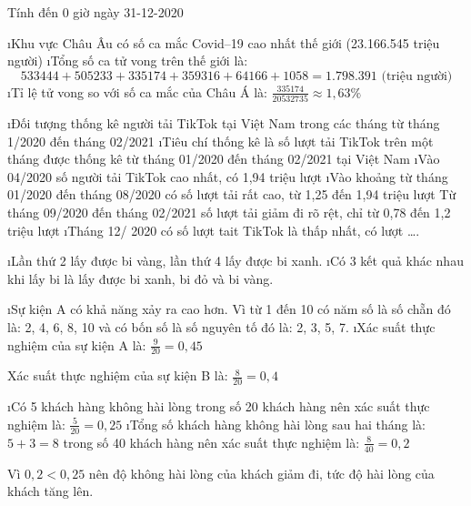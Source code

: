 \begin{Answer}{4}
		Tính đến 0 giờ ngày 31-12-2020
		\begin{enumerate}[a),leftmargin=*]
			\i Khu vực Châu Âu có số ca mắc Covid--19 cao nhất thế giới (23.166.545 triệu người)
			\i Tổng số ca tử vong trên thế giới là:
			\[533444 + 505233 + 335174 + 359316 + 64166 + 1058 = 1.798.391 \text{ (triệu người)}\]
			\i Tỉ lệ tử vong so với số ca mắc của Châu Á là:  $\frac{{335174}}{{20532735}} \approx 1,63\%$
		\end{enumerate}
	
\end{Answer}
\begin{Answer}{5}
		\begin{enumerate}[--,leftmargin=*]
			\i Đối tượng thống kê người tải TikTok tại Việt Nam trong các tháng từ tháng 1/2020 đến tháng 02/2021
			\i Tiêu chí thống kê là số lượt tải TikTok trên một tháng được thống kê từ tháng 01/2020 đến tháng 02/2021 tại Việt Nam
			\i Vào 04/2020 số người tải TikTok cao nhất, có 1,94 triệu lượt
			\i Vào khoảng từ tháng 01/2020 đến tháng 08/2020 có số lượt tải rất cao, từ 1,25  đến 1,94 triệu lượt
			Từ tháng 09/2020 đến tháng 02/2021 số lượt tải giảm đi rõ rệt, chỉ từ 0,78 đến 1,2 triệu lượt
			\i Tháng 12/ 2020 có số lượt tait TikTok là thấp nhất, có  lượt \ldots.
		\end{enumerate}
	
\end{Answer}
\begin{Answer}{6}
		\begin{enumerate}[a),leftmargin=*]
			\i Lần thứ 2 lấy được bi vàng, lần thứ 4 lấy được bi xanh.
			\i Có 3 kết quả khác nhau khi lấy bi là lấy được bi xanh, bi đỏ và bi vàng.
		\end{enumerate}
	
\end{Answer}
\begin{Answer}{7}
		\begin{enumerate}[a),leftmargin=*]
			\i Sự kiện A có khả năng xảy ra cao hơn. Vì từ 1 đến 10 có năm số là số chẵn đó là: 2, 4, 6, 8, 10 và có bốn số là số nguyên tố đó là: 2, 3, 5, 7.
			\i Xác suất thực nghiệm của sự kiện A là: $\frac{9}{{20}} = 0,45$
			
			Xác suất thực nghiệm của sự kiện B là:  $\frac{8}{{20}} = 0,4$
		\end{enumerate}
	
\end{Answer}
\begin{Answer}{8}
		\begin{enumerate}[a),leftmargin=*]
			\i Có 5 khách hàng không hài lòng trong số 20 khách hàng nên xác suất thực nghiệm là: $\frac{5}{{20}} = 0,25$
			\i Tổng số khách hàng không hài lòng sau hai tháng là: $5 + 3 = 8$ trong số 40 khách hàng nên xác suất thực nghiệm là:   $\frac{8}{{40}} = 0,2$
			
			Vì $0,2 < 0,25$ nên độ không hài lòng của khách giảm đi, tức độ hài lòng của khách tăng lên.
		\end{enumerate}
	
\end{Answer}
